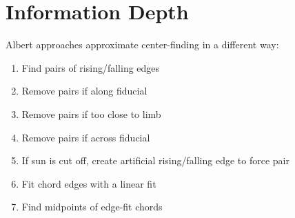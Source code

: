 \documentclass[10pt]{scrartcl}
\begin{document}
\begin{figure}[!ht]
\end{figure}

\section{Information Depth} %
\label{sec:information_depth}
Albert approaches approximate center-finding in a different way:

\begin{enumerate}
    \item Find pairs of rising/falling edges 
    \item Remove pairs if along fiducial
    \item Remove pairs if too close to limb
    \item Remove pairs if across fiducial
    \item If sun is cut off, create artificial rising/falling edge to force pair
    \item Fit chord edges with a linear fit
    \item Find midpoints of edge-fit chords
\end{enumerate}
\end{document}

